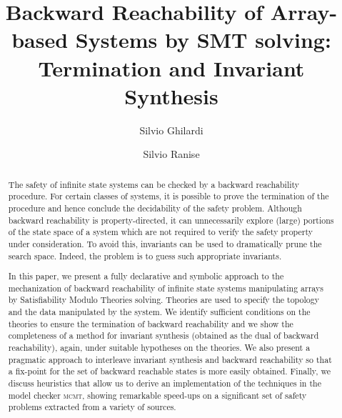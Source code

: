 \documentclass{LMCS}
\theoremstyle{plain}\newtheorem{assumption}[thm]{Assumption}
\theoremstyle{plain}\newtheorem{proposition}[thm]{Proposition}
\theoremstyle{plain}\newtheorem{property}[thm]{Property}
\theoremstyle{plain}\newtheorem{example}[thm]{Example}
\theoremstyle{plain}\newtheorem{claim}[thm]{Claim}
\theoremstyle{plain}\newtheorem{lemma}[thm]{Lemma}
\begin{document}
\title[Backward Reachability of Array-based Systems by SMT solving]{Backward Reachability of Array-based Systems by SMT solving:
  Termination and Invariant Synthesis}

\author[S.\ Ghilardi]{Silvio Ghilardi}	\address{Dipartimento di Scienze dell'Informazione, Universit\`a degli Studi di Milano (Italy)}	  

\author[S.\ Ranise]{Silvio Ranise}	\address{FBK-Irst, Trento (Italy)}	  







\begin{abstract}
  The safety of infinite state systems can be checked by a backward
  reachability procedure.  For certain classes of systems, it is
  possible to prove the termination of the procedure and hence
  conclude the decidability of the safety problem.  Although backward
  reachability is property-directed, it can unnecessarily explore
  (large) portions of the state space of a system which are not
  required to verify the safety property under consideration.  To
  avoid this, invariants can be used to dramatically prune the search
  space.  Indeed, the problem is to guess such appropriate invariants.

  In this paper, we present a fully declarative and symbolic approach
  to the mechanization of backward reachability of infinite state
  systems manipulating arrays by Satisfiability Modulo Theories
  solving.  Theories are used to specify the topology and the data
  manipulated by the system.  We identify sufficient conditions on the
  theories to ensure the termination of backward reachability and we
  show the completeness of a method for invariant synthesis (obtained
  as the dual of backward reachability), again, under suitable
  hypotheses on the theories.  We also present a pragmatic approach to
  interleave invariant synthesis and backward reachability so that a
  fix-point for the set of backward reachable states is more easily
  obtained.  Finally, we discuss heuristics that allow us to derive an
  implementation of the techniques in the model checker \textsc{mcmt},
  showing remarkable speed-ups on a significant set of safety problems
  extracted from a variety of sources.
\end{abstract}
\end{document}
